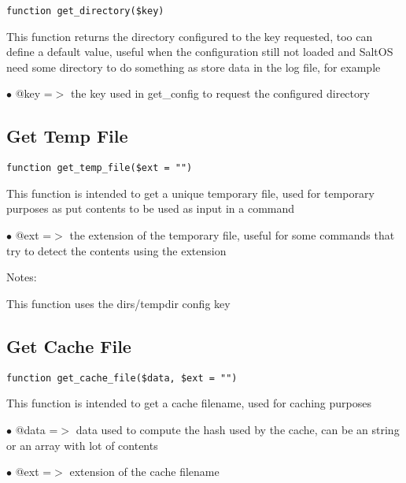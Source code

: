 \documentclass[a4paper]{book}
\begin{document}
\begin{lstlisting}
function get_directory($key)
\end{lstlisting}

This function returns the directory configured to the key requested, too can define a default
value, useful when the configuration still not loaded and SaltOS need some directory to do
something as store data in the log file, for example

\begin{compactitem}
\item[\color{myblue}$\bullet$] @key =$>$ the key used in get\_config to request the configured directory
\end{compactitem}

\hypertarget{toc127}{}
\subsection{Get Temp File}

\begin{lstlisting}
function get_temp_file($ext = "")
\end{lstlisting}

This function is intended to get a unique temporary file, used for temporary
purposes as put contents to be used as input in a command

\begin{compactitem}
\item[\color{myblue}$\bullet$] @ext =$>$ the extension of the temporary file, useful for some commands that
        try to detect the contents using the extension
\end{compactitem}

Notes:

This function uses the dirs/tempdir config key

\hypertarget{toc128}{}
\subsection{Get Cache File}

\begin{lstlisting}
function get_cache_file($data, $ext = "")
\end{lstlisting}

This function is intended to get a cache filename, used for caching purposes

\begin{compactitem}
\item[\color{myblue}$\bullet$] @data =$>$ data used to compute the hash used by the cache, can be an string or
         an array with lot of contents
\item[\color{myblue}$\bullet$] @ext  =$>$ extension of the cache filename
\end{compactitem}
\end{document}
